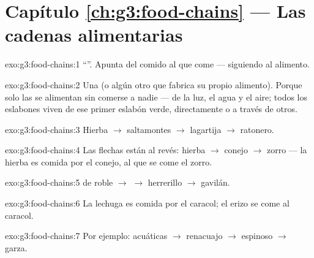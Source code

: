 \section*{Capítulo \ref{ch:g3:food-chains} --- Las cadenas alimentarias}

\begin{solution}{exo:g3:food-chains:1}
``''. Apunta del comido al que come --- siguiendo al
alimento.
\end{solution}

\begin{solution}{exo:g3:food-chains:2}
Una  (o algún otro  que fabrica su propio alimento).
Porque solo las  se alimentan sin comerse a nadie --- de la
luz, el agua y el aire; todos los eslabones  viven de ese
primer eslabón verde, directamente o a través de otros.
\end{solution}

\begin{solution}{exo:g3:food-chains:3}
Hierba $\rightarrow$ saltamontes $\rightarrow$ lagartija
$\rightarrow$ ratonero.
\end{solution}

\begin{solution}{exo:g3:food-chains:4}
Las flechas están al revés: hierba $\rightarrow$ conejo
$\rightarrow$ zorro --- la hierba es comida por el conejo, al que se
come el zorro.
\end{solution}

\begin{solution}{exo:g3:food-chains:5}
 de roble $\rightarrow$  $\rightarrow$ herrerillo
$\rightarrow$ gavilán.
\end{solution}

\begin{solution}{exo:g3:food-chains:6}
La lechuga es comida por el caracol; el erizo se come al caracol.
\end{solution}

\begin{solution}{exo:g3:food-chains:7}
Por ejemplo:  acuáticas $\rightarrow$ renacuajo $\rightarrow$
espinoso $\rightarrow$ garza.
\end{solution}

